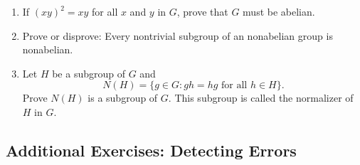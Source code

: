 {\begin{enumerate}
 
\item
If $(xy)^2 = xy$ for all $x$ and $y$ in $G$, prove that $G$ must be
abelian.
 
 
\item
Prove or disprove: Every nontrivial subgroup of an nonabelian group is
nonabelian.
 
 
\item
Let $H$ be a subgroup of $G$ and
$$
N(H) = \{ g \in G : gh = hg \mbox{ for all $h \in H$}  \}.
$$
Prove $N(H)$ is a subgroup of $G$.  This subgroup is called the {\bfi
normalizer\/} of $H$ in $G$. 
 
\end{enumerate}
}
 
 
\subsection*{Additional Exercises: Detecting Errors}
 

